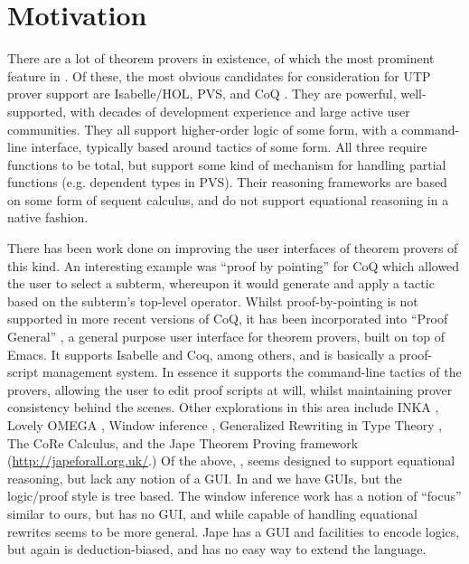 \section{Motivation}\label{sec:motivation}

There are a lot of theorem provers in existence,
of which the most prominent feature in \cite{conf/tphol/2006provers}.
Of these, the most obvious candidates for consideration for UTP prover support
are Isabelle/HOL\cite{books/sp/NipkowPW02},
PVS\cite{conf/fmcad/Shankar96},
and CoQ \cite{bk:Coq'Art:04}.
They are powerful, well-supported,
with decades of development experience
and large active user communities.
They all support higher-order logic of some form, with a command-line interface,
typically based around tactics of some form. All three require functions to be total,
but support some kind of mechanism for handling partial functions
(e.g. dependent types in PVS).
Their reasoning frameworks are based on some form of sequent calculus,
and do not support equational reasoning in a native fashion.

There has been work done on improving the user interfaces
of theorem provers of this kind.
An interesting example was ``proof by pointing'' \cite{conf/tacs/BertotKT94}
for CoQ which allowed the user to select a subterm,
whereupon it would generate and apply a tactic based on the subterm's top-level
operator.
Whilst proof-by-pointing is not supported in more recent versions of CoQ,
it has been incorporated into ``Proof General'' \cite{conf/tacas/Aspinall00},
a general purpose user interface for theorem provers, built on top of Emacs.
It supports Isabelle and Coq, among others,
and is basically a proof-script management system.
In essence it supports the command-line tactics of the provers,
allowing the user to edit proof scripts at will,
whilst maintaining prover consistency behind the scenes.
Other explorations in this area include
INKA \cite{Hutter96}, Lovely OMEGA \cite{oai:CiteSeerXPSU:10.1.1.42.1864},
Window inference \cite{Staples95},
Generalized Rewriting in Type Theory \cite{journals/eik/Basin94},
The CoRe Calculus, \cite{conf/cade/Autexier05}
and the Jape Theorem Proving framework (\url{http://japeforall.org.uk/}.)
Of the above, \cite{conf/cade/Autexier05},\cite{journals/eik/Basin94} seems designed
to support equational reasoning, but lack any notion of a GUI. In \cite{Hutter96} and \cite{oai:CiteSeerXPSU:10.1.1.42.1864} we have GUIs, but the logic/proof style is tree based.
The window inference work \cite{Staples95} has a notion of ``focus'' similar to ours,
but has no GUI, and while capable of handling equational rewrites seems to be more general.
Jape has a GUI and facilities to encode logics, but again is deduction-biased, and has no easy 
way to extend the language.



